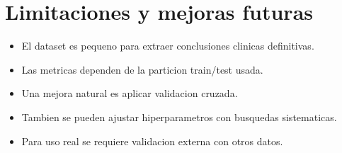 \documentclass[12pt,letterpaper]{article}
\begin{document}
\section{Limitaciones y mejoras futuras}

\begin{itemize}[leftmargin=*]
    \item El dataset es pequeno para extraer conclusiones clinicas definitivas.
    \item Las metricas dependen de la particion train/test usada.
    \item Una mejora natural es aplicar validacion cruzada.
    \item Tambien se pueden ajustar hiperparametros con busquedas sistematicas.
    \item Para uso real se requiere validacion externa con otros datos.
\end{itemize}
\end{document}
